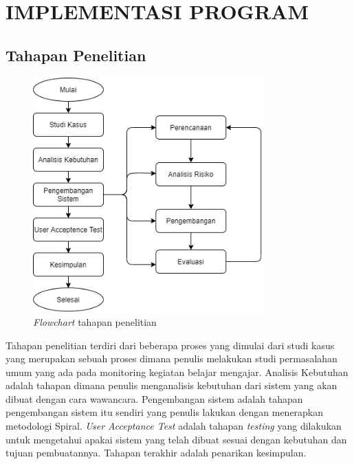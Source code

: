 
\chapter{IMPLEMENTASI PROGRAM}


\section{Tahapan Penelitian}

\begin{figure}[H]
	\centering
	\includegraphics[width=0.8\textwidth]{gambar/diagram/flowchart}
	\caption{\textit{Flowchart} tahapan penelitian}
	\label{fig:flow}
\end{figure}

Tahapan penelitian terdiri dari beberapa proses yang dimulai dari studi kasus yang merupakan sebuah proses dimana penulis melakukan studi permasalahan umum yang ada pada monitoring kegiatan belajar mengajar. Analisis Kebutuhan adalah tahapan dimana penulis menganalisis kebutuhan dari sistem yang akan dibuat dengan cara wawancara. Pengembangan sistem adalah tahapan pengembangan sistem itu sendiri yang penulis lakukan dengan menerapkan metodologi Spiral. \textit{User Acceptance Test} adalah tahapan \textit{testing} yang dilakukan untuk mengetahui apakai sistem yang telah dibuat sesuai dengan kebutuhan dan tujuan pembuatannya. Tahapan terakhir adalah penarikan kesimpulan.

